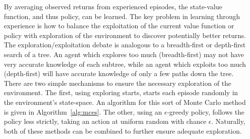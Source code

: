 By averaging observed returns from experienced episodes,
the state-value function,
and thus policy,
can be learned.
%
The key problem in learning through experience is how to balance
the exploitation of the current value function or policy
with exploration of the environment to discover potentially better returns.
%
The exploration/exploitation debate is analogous to a breadth-first or
depth-first search of a tree.
%
An agent which explores too much (breadth-first)
may not have very accurate knowledge of each subtree,
while an agent which exploits too much (depth-first) will have accurate
knowledge of only a few paths down the tree.
%
There are two simple mechanisms to ensure the necessary exploration of the
environment.
%
The first,
using exploring starts,
starts each episode randomly in the environment's state-space.
%
An algorithm for this sort of Monte Carlo method is given in
Algorithm~\ref{alg:mces}.
%
The other,
using an $\epsilon$-greedy policy,
follows the policy less strictly,
taking an action at uniform random with chance $\epsilon$.
%
Naturally,
both of these methods can be combined to further ensure adequate exploration.


